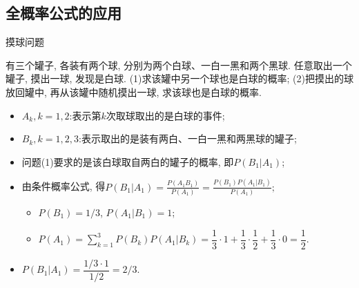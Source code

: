 \documentclass[Prob-All.tex]{subfiles}
\begin{document}
\subsection{全概率公式的应用}
\begin{frame}{摸球问题}
	\begin{exam}
		有三个罐子, 各装有两个球, 分别为两个白球、一白一黑和两个黑球. 任意取出一个罐子, 摸出一球, 发现是白球. (1)求该罐中另一个球也是白球的概率; (2)把摸出的球放回罐中, 再从该罐中随机摸出一球, 求该球也是白球的概率.
	\end{exam}

	\begin{jieda}
		\begin{itemize}[<+-|alert@+>]
			\item $A_k, k=1,2$:表示第$k$次取球取出的是白球的事件;
			\item $B_k, k=1,2,3$:表示取出的是装有两白、一白一黑和两黑球的罐子;
			\item 问题(1)要求的是该白球取自两白的罐子的概率, 即$P(B_1|A_1)$;
			\item 由条件概率公式, 得$P(B_1|A_1)=\frac{P(A_1B_1)}{P(A_1)}=\frac{P(B_1)P(A_1|B_1)}{P(A_1)};$%
			\begin{itemize}[<+-|alert@+>]
				\item $P(B_1)=1/3$, \pause $P(A_1|B_1)=1$;\pause
				\item $P(A_1)=\sum\limits_{k=1}^{3}P(B_k)P(A_1|B_k)=\dfrac{1}{3}\cdot 1+\dfrac{1}{3}\cdot\dfrac{1}{2}+\dfrac{1}{3}\cdot 0=\dfrac{1}{2}.$
			\end{itemize}
			\item $P(B_1|A_1)=\dfrac{1/3\cdot 1}{1/2}=2/3$.
		\end{itemize}

	\end{jieda}
\end{frame}
\end{document}
